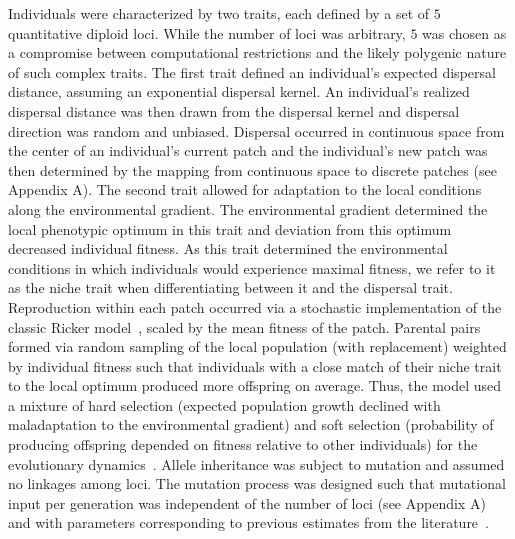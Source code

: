 \documentclass[11pt]{article}
\begin{document}
Individuals were characterized by two traits, each defined by a set of $5$ quantitative diploid loci. While the number of loci was arbitrary, $5$ was chosen as a compromise between computational restrictions and the likely polygenic nature of such complex traits. The first trait defined an individual's expected dispersal distance, assuming an exponential dispersal kernel. An individual's realized dispersal distance was then drawn from the dispersal kernel and dispersal direction was random and unbiased. Dispersal occurred in continuous space from the center of an individual's current patch and the individual's new patch was then determined by the mapping from continuous space to discrete patches (see Appendix A). The second trait allowed for adaptation to the local conditions along the environmental gradient. The environmental gradient determined the local phenotypic optimum in this trait and deviation from this optimum decreased individual fitness. As this trait determined the environmental conditions in which individuals would experience maximal fitness, we refer to it as the niche trait when differentiating between it and the dispersal trait. Reproduction within each patch occurred via a stochastic implementation of the classic Ricker model~\citep{ricker1954stock, melbourne2008extinction}, scaled by the mean fitness of the patch. Parental pairs formed via random sampling of the local population (with replacement) weighted by individual fitness such that individuals with a close match of their niche trait to the local optimum produced more offspring on average. Thus, the model used a mixture of  hard selection (expected population growth declined with maladaptation to the environmental gradient) and soft selection (probability of producing offspring depended on fitness relative to other individuals) for the evolutionary dynamics~\citep{wallace1975hard}. Allele inheritance was subject to mutation and assumed no linkages among loci. The mutation process was designed such that mutational input per generation was independent of the number of loci (see Appendix A) and with parameters corresponding to previous estimates from the literature~\citep{gilbert2017local}.
\end{document}
